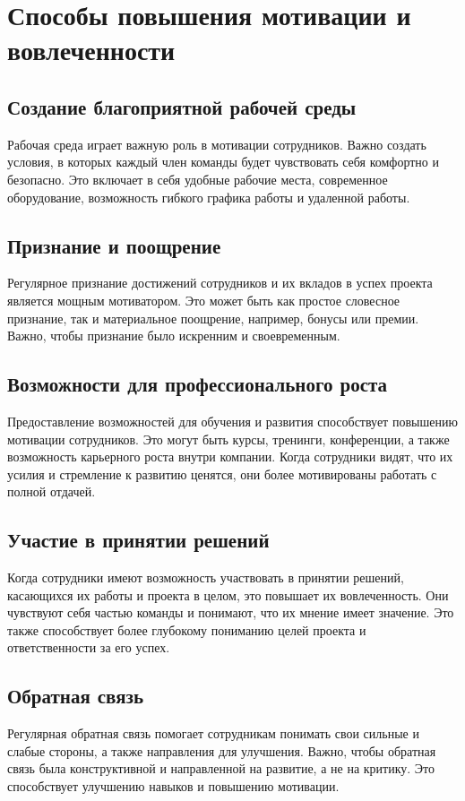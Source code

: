     \section{Способы повышения мотивации и вовлеченности}

    \subsection{Создание благоприятной рабочей среды}
    Рабочая среда играет важную роль в мотивации сотрудников. Важно создать условия, в которых каждый член команды будет чувствовать себя комфортно и безопасно. Это включает в себя удобные рабочие места, современное оборудование, возможность гибкого графика работы и удаленной работы.

    \subsection{Признание и поощрение}
    Регулярное признание достижений сотрудников и их вкладов в успех проекта является мощным мотиватором. Это может быть как простое словесное признание, так и материальное поощрение, например, бонусы или премии. Важно, чтобы признание было искренним и своевременным.

    \subsection{Возможности для профессионального роста}
    Предоставление возможностей для обучения и развития способствует повышению мотивации сотрудников. Это могут быть курсы, тренинги, конференции, а также возможность карьерного роста внутри компании. Когда сотрудники видят, что их усилия и стремление к развитию ценятся, они более мотивированы работать с полной отдачей.

    \subsection{Участие в принятии решений}
    Когда сотрудники имеют возможность участвовать в принятии решений, касающихся их работы и проекта в целом, это повышает их вовлеченность. Они чувствуют себя частью команды и понимают, что их мнение имеет значение. Это также способствует более глубокому пониманию целей проекта и ответственности за его успех.

    \subsection{Обратная связь}
    Регулярная обратная связь помогает сотрудникам понимать свои сильные и слабые стороны, а также направления для улучшения. Важно, чтобы обратная связь была конструктивной и направленной на развитие, а не на критику. Это способствует улучшению навыков и повышению мотивации.

